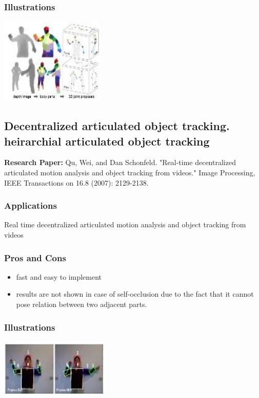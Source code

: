 \documentclass[a4paper,10pt]{report}
\begin{document}
\subsubsection{Illustrations}\newline\newline
\includegraphics{./skeltrack2.png}
\newline \newline

\subsection{Decentralized articulated object tracking. heirarchial articulated object tracking}
\textbf{Research Paper:} Qu, Wei, and Dan Schonfeld. "Real-time decentralized articulated motion analysis and object tracking from videos." Image Processing, IEEE Transactions on 16.8 (2007): 2129-2138.
\subsubsection{Applications}
Real time decentralized articulated motion analysis and object tracking from videos
\subsubsection{Pros and Cons}
\begin{itemize}
 \item fast and easy to implement
 \item results are not shown in case of self-occlusion due to the fact that it cannot pose relation between two adjacent parts.
\end{itemize}
\subsubsection{Illustrations}\newline\newline
\includegraphics{./skeltrack3.png}
\newline \newline
\end{document}
